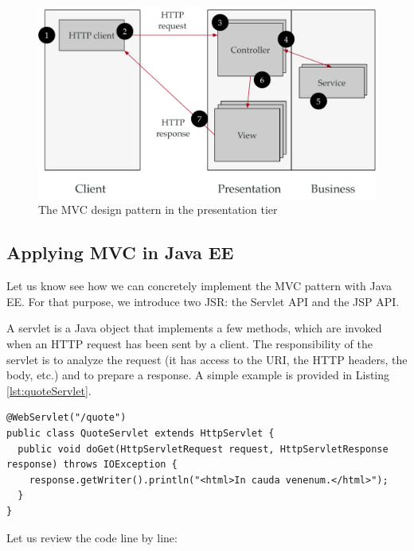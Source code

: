 \begin{figure}[]
	\centering
    \includegraphics[width=1.0\linewidth]{Figures/MVC.pdf}
	\caption{The MVC design pattern in the presentation tier}
  \label{fig:mvc-in-presentation-tier}
\end{figure}

\subsection{Applying MVC in Java EE}

Let us know see how we can concretely implement the \ac{MVC} pattern with Java EE. For that purpose, we introduce two \ac{JSR}: the Servlet API and the \ac{JSP} API. 

A servlet is a Java object that implements a few methods, which are invoked when an HTTP request has been sent by a client. The responsibility of the servlet is to analyze the request (it has access to the URI, the HTTP headers, the body, etc.) and to prepare a response. A simple example is provided in Listing \ref{lst:quoteServlet}. 

\vspace{10pt}
\begin{minipage}{\linewidth}
\begin{lstlisting}[frame=single]
@WebServlet("/quote")
public class QuoteServlet extends HttpServlet {
  public void doGet(HttpServletRequest request, HttpServletResponse response) throws IOException {
    response.getWriter().println("<html>In cauda venenum.</html>");
  }
}
\end{lstlisting}
\end{minipage}

Let us review the code line by line:


